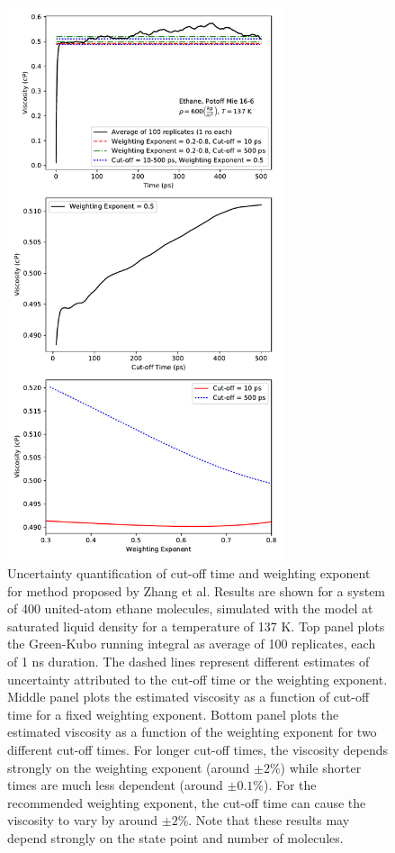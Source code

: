 \documentclass[9pt]{livecoms}
\begin{document}
\begin{figure}[htb!]
	\centering
	\includegraphics[width=3.2in]{figures/GreenKubo_tcut_b_dependence.pdf}
	\caption{Uncertainty quantification of cut-off time and weighting exponent for method proposed by Zhang et al. Results are shown for a system of 400 united-atom ethane molecules, simulated with the \cite{Potoff2009} model at saturated liquid density for a temperature of 137 K. Top panel plots the Green-Kubo running integral as average of 100 replicates, each of 1 ns duration. The dashed lines represent different estimates of uncertainty attributed to the cut-off time or the weighting exponent. Middle panel plots the estimated viscosity as a function of cut-off time for a fixed weighting exponent. Bottom panel plots the estimated viscosity as a function of the weighting exponent for two different cut-off times. For longer cut-off times, the viscosity depends strongly on the weighting exponent (around $\pm 2$\%) while shorter times are much less dependent (around $\pm 0.1$\%). For the recommended weighting exponent, the cut-off time can cause the viscosity to vary by around $\pm 2$\%. Note that these results may depend strongly on the state point and number of molecules.}
	\label{fig:GK_tcut_b}
\end{figure}
\end{document}
